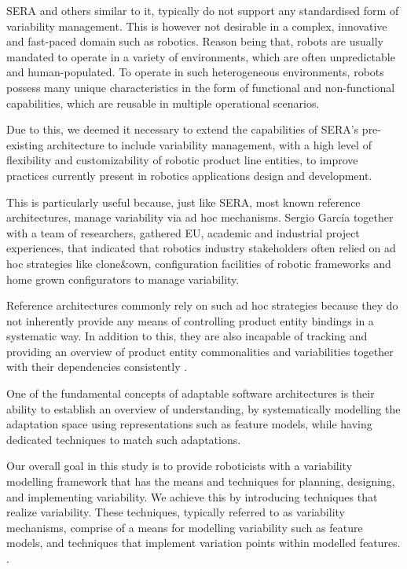 \documentclass[conference]{IEEEtran}
\begin{document}
SERA and others similar to it, typically do not support any standardised form of variability management. This is however not desirable in a complex, innovative and fast-paced domain such as robotics. Reason being that, robots are usually mandated to operate in a variety of environments, which are often unpredictable and human-populated. To operate in such heterogeneous environments, robots possess many unique characteristics in the form of functional and non-functional capabilities, which are reusable in multiple operational scenarios.

Due to this, we deemed it necessary to extend the capabilities of SERA's pre-existing architecture to include variability management, with a high level of flexibility and customizability of robotic product line entities, to improve practices currently present in robotics applications design and development.

This is particularly useful because, just like SERA, most known reference architectures, manage variability via ad hoc mechanisms. Sergio Garc\'{i}a \cite{var-mod-chall} together with a team of researchers, gathered EU, academic and industrial project experiences, that indicated that robotics industry stakeholders often relied on ad hoc strategies like clone\&own, configuration facilities of robotic frameworks and home grown configurators to manage variability.

Reference architectures commonly rely on such ad hoc strategies because they do not inherently provide any means of controlling product entity bindings in a systematic way. In addition to this, they are also incapable of tracking and providing an overview of product entity commonalities and variabilities together with their dependencies consistently \cite{var-mod-ind}.

One of the fundamental concepts of adaptable software architectures is their ability to establish an overview of understanding, by systematically modelling the adaptation space using representations such as feature models, while having dedicated techniques to match such adaptations.

Our overall goal in this study is to provide roboticists with a variability modelling framework that has the means and techniques for planning, designing, and implementing variability. We achieve this by introducing techniques that realize variability. These techniques, typically referred to as variability mechanisms, comprise of a means for modelling variability such as feature models, and techniques that implement variation points within modelled features. \cite{var-mod-ind}.
\end{document}
